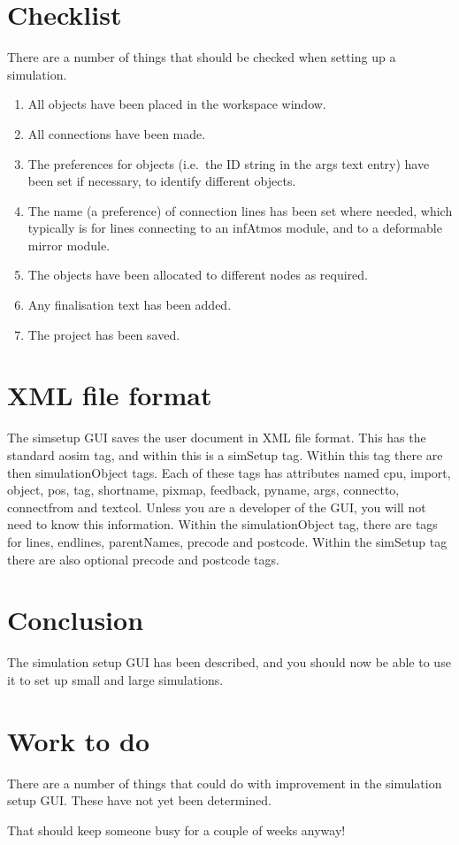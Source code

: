 \documentclass{article}
\begin{document}
\section{Checklist}
There are a number of things that should be checked when setting up a
simulation.  
\begin{enumerate}
\item All objects have been placed in the workspace window.
\item All connections have been made.
\item The preferences for objects (i.e.\ the ID string in the args
text entry) have been set if necessary, to identify different objects.
\item The name (a preference) of connection lines has been set where
needed, which typically is for lines connecting to an infAtmos module,
and to a deformable mirror module.
\item The objects have been allocated to different nodes as required.
\item Any finalisation text has been added.
\item The project has been saved.
\end{enumerate}

\section{XML file format}
The simsetup GUI saves the user document in XML file format.  This has
the standard aosim tag, and within this is a simSetup tag.  Within
this tag there are then simulationObject tags.  Each of these tags has
attributes named cpu, import, object, pos, tag, shortname, pixmap,
feedback, pyname, args, connectto, connectfrom and textcol.  Unless
you are a developer of the GUI, you will not need to know this
information.  Within the simulationObject tag, there are tags for
lines, endlines, parentNames, precode and postcode.  Within the
simSetup tag there are also optional precode and postcode tags.


\section{Conclusion}
The simulation setup GUI has been described, and you should now be
able to use it to set up small and large simulations.

\section{Work to do}
There are a number of things that could do with improvement in the
simulation setup GUI.  These have not yet been determined.

That should keep someone busy for a couple of weeks anyway!

\printindex
\end{document}

